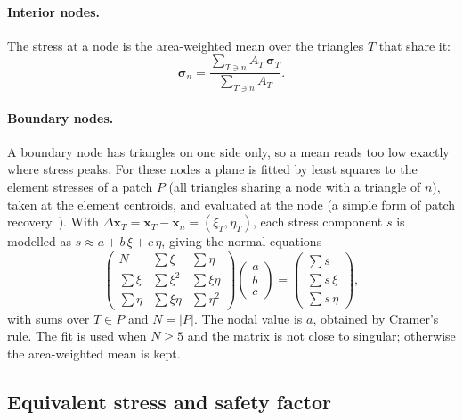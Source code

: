 \documentclass[11pt,a4paper]{article}
\newcommand{\vect}[1]{\mathbf{#1}}
\begin{document}
\paragraph{Interior nodes.} The stress at a node is the area-weighted mean
over the triangles $T$ that share it:
\begin{equation}
  \boldsymbol{\sigma}_n = \frac{\sum_{T\ni n} A_T\,\boldsymbol{\sigma}_T}
                               {\sum_{T\ni n} A_T}.
\end{equation}

\paragraph{Boundary nodes.} A boundary node has triangles on one side only,
so a mean reads too low exactly where stress peaks. For these nodes a plane
is fitted by least squares to the element stresses of a patch $P$ (all
triangles sharing a node with a triangle of $n$), taken at the element
centroids, and evaluated at the node (a simple form of patch
recovery~\cite{zz}). With
$\Delta\vect{x}_T = \vect{x}_T - \vect{x}_n = (\xi_T,\eta_T)$, each stress
component $s$ is modelled as $s \approx a + b\,\xi + c\,\eta$, giving the
normal equations
\begin{equation}
  \begin{pmatrix}
    N & \sum\xi & \sum\eta\\
    \sum\xi & \sum\xi^2 & \sum\xi\eta\\
    \sum\eta & \sum\xi\eta & \sum\eta^2
  \end{pmatrix}
  \begin{pmatrix} a\\ b\\ c \end{pmatrix}
  =
  \begin{pmatrix} \sum s\\ \sum s\,\xi\\ \sum s\,\eta \end{pmatrix},
\end{equation}
with sums over $T\in P$ and $N=|P|$. The nodal value is $a$, obtained by
Cramer's rule. The fit is used when $N\ge5$ and the matrix is not close to
singular; otherwise the area-weighted mean is kept.

\subsection{Equivalent stress and safety factor}
\end{document}
